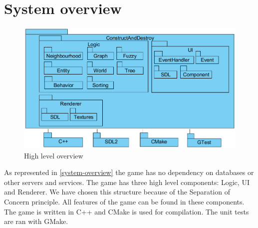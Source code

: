 
\section{System overview}

\begin{figure}[!htb]
    \centering
    \includegraphics[scale=0.75]{res/high-level-overview.png}
    \caption{High level overview}\label{fig:system-overview}
\end{figure}

As represented in \cref{system-overview} the game has no dependency on databases or other servers and services. The game has three high level components: Logic, UI and Renderer. We have chosen this structure because of the Separation of Concern principle. All features of the game can be found in these components. The game is written in C++ and CMake is used for compilation. The unit tests are ran with GMake.